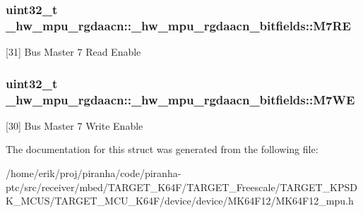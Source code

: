 \subsubsection[{\texorpdfstring{M7\+RE}{M7RE}}]{\setlength{\rightskip}{0pt plus 5cm}uint32\+\_\+t \+\_\+hw\+\_\+mpu\+\_\+rgdaacn\+::\+\_\+hw\+\_\+mpu\+\_\+rgdaacn\+\_\+bitfields\+::\+M7\+RE}\hypertarget{struct__hw__mpu__rgdaacn_1_1__hw__mpu__rgdaacn__bitfields_a01d7cb18b7e907d8c957ee72ae0be251}{}\label{struct__hw__mpu__rgdaacn_1_1__hw__mpu__rgdaacn__bitfields_a01d7cb18b7e907d8c957ee72ae0be251}
\mbox{[}31\mbox{]} Bus Master 7 Read Enable 
\subsubsection[{\texorpdfstring{M7\+WE}{M7WE}}]{\setlength{\rightskip}{0pt plus 5cm}uint32\+\_\+t \+\_\+hw\+\_\+mpu\+\_\+rgdaacn\+::\+\_\+hw\+\_\+mpu\+\_\+rgdaacn\+\_\+bitfields\+::\+M7\+WE}\hypertarget{struct__hw__mpu__rgdaacn_1_1__hw__mpu__rgdaacn__bitfields_ac4fe1ddd4e4c31b98f925223264479c1}{}\label{struct__hw__mpu__rgdaacn_1_1__hw__mpu__rgdaacn__bitfields_ac4fe1ddd4e4c31b98f925223264479c1}
\mbox{[}30\mbox{]} Bus Master 7 Write Enable 

The documentation for this struct was generated from the following file\+:\begin{DoxyCompactItemize}
\item 
/home/erik/proj/piranha/code/piranha-\/ptc/src/receiver/mbed/\+T\+A\+R\+G\+E\+T\+\_\+\+K64\+F/\+T\+A\+R\+G\+E\+T\+\_\+\+Freescale/\+T\+A\+R\+G\+E\+T\+\_\+\+K\+P\+S\+D\+K\+\_\+\+M\+C\+U\+S/\+T\+A\+R\+G\+E\+T\+\_\+\+M\+C\+U\+\_\+\+K64\+F/device/device/\+M\+K64\+F12/M\+K64\+F12\+\_\+mpu.\+h\end{DoxyCompactItemize}
